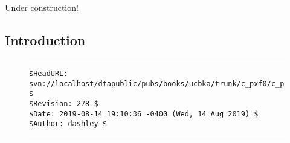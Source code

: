 
\chapter{\cpxfzerolongtitle{}}

\label{cpxf0}

                     {Under construction!}


\section{Introduction}



\vfill
\noindent\begin{figure}[!b]
\noindent\rule[-0.25in]{\textwidth}{1pt}
\begin{tiny}
\begin{verbatim}
$HeadURL: svn://localhost/dtapublic/pubs/books/ucbka/trunk/c_pxf0/c_pxf0.tex $
$Revision: 278 $
$Date: 2019-08-14 19:10:36 -0400 (Wed, 14 Aug 2019) $
$Author: dashley $
\end{verbatim}
\end{tiny}
\noindent\rule[0.25in]{\textwidth}{1pt}
\end{figure}
%
